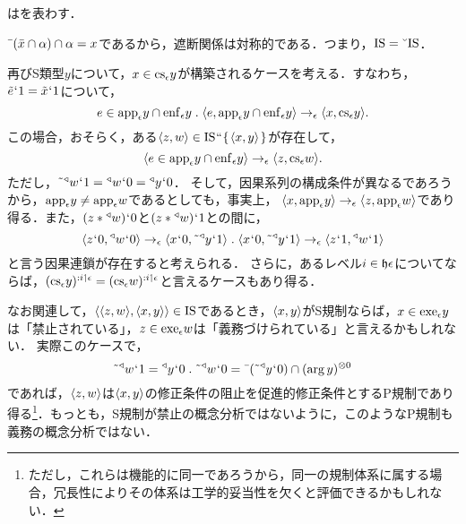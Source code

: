 \begin{df}
\label{df:遮断関係}
はを表わす．
\end{df}

\noindent $ \bar{\:\:}(\bar{x}\cap\alpha)\cap\alpha = x $であるから，遮断関係は対称的である．つまり，$ \mathrm{IS}=\breve{\:\:}\mathrm{IS} $．

再びS類型$y$について，$ x\in\mathrm{cs}_{\epsilon}y $が構築されるケースを考える．すなわち，$ \tilde{e}{\mspace{1mu}{`}\mspace{1mu}} 1 = \tilde{x}{\mspace{1mu}{`}\mspace{1mu}} 1 $について，
\[
    e\in\app{\epsilon} y\cap\enf{\epsilon}y\con{1}
    \orp{e,\app{\epsilon} y\cap\enf{\epsilon}y}\to_{\epsilon}\orp{x,\cs{\epsilon}y}.
\]
この場合，おそらく，ある$ \langle z,w \rangle\in\mathrm{IS}{\mspace{1mu}{``}\mspace{1mu}}\{\mspace{2mu}\langle x,y \rangle\mspace{2mu}\} $が存在して，
\[
    \langle e\in\mathrm{app}_{\epsilon} y\cap\mathrm{enf}_{\epsilon}y \rangle\to_{\epsilon}\langle z,\mathrm{cs}_{\epsilon}w \rangle.
\]
ただし，$ \tilde{\:\:}{^\triangleleft}w{\mspace{1mu}{`}\mspace{1mu}} 1 = {^\triangleleft}w{\mspace{1mu}{`}\mspace{1mu}} 0 = {^\triangleleft}y{\mspace{1mu}{`}\mspace{1mu}} 0 $．
そして，因果系列の構成条件が異なるであろうから，$ \mathrm{app}_{\epsilon} y \neq \mathrm{app}_{\epsilon} w $であるとしても，事実上，
$ \langle x,\mathrm{app}_{\epsilon} y \rangle\to_{\epsilon}\langle z,\mathrm{app}_{\epsilon} w \rangle $であり得る．また，$ (z*{^\triangleleft}w){\mspace{1mu}{`}\mspace{1mu}} 0 $と$ (z*{^\triangleleft}w){\mspace{1mu}{`}\mspace{1mu}} 1 $との間に，
\[
   \orp{z\fap 0,\trgl{w}\fap 0}\to_{\epsilon}\orp{x\fap 0,\tildel{\trgl{y}}\fap 1}\con{1}
    \orp{x\fap 0,\tildel{\trgl{y}}\fap 1}\to_{\epsilon}\orp{z\fap 1,\trgl{w}\fap 1}
\]
と言う因果連鎖が存在すると考えられる．
さらに，あるレベル$ i\in\mathfrak{h}\epsilon $についてならば，$ (\mathrm{cs}_{\epsilon}y)^{:i\mathbin{\upharpoonleft}\epsilon} = (\mathrm{cs}_{\epsilon}w)^{:i\mathbin{\upharpoonleft}\epsilon} $と言えるケースもあり得る．

なお関連して，$ \langle \langle z,w \rangle,\langle x,y \rangle \rangle\in\mathrm{IS} $であるとき，$ \langle x,y \rangle $がS規制ならば，$ x\in\mathrm{exe}_{\epsilon} y $は「禁止されている」，$ z\in\mathrm{exe}_{\epsilon} w $は「義務づけられている」と言えるかもしれない．
実際このケースで，
\[
    \tildel{\trgl{w}}\fap 1 = \trgl{y}\fap 0\con{1}
    \tildel{\trgl{w}}\fap 0 = \barl{(\tildel{\trgl{y}}\fap 0)}\cap\mser{(\arg y)}{0}
\]
であれば，$ \langle z,w \rangle $は$ \langle x,y \rangle $の修正条件の阻止を促進的修正条件とするP規制であり得る\footnote{
    ただし，これらは機能的に同一であろうから，同一の規制体系に属する場合，冗長性によりその体系は工学的妥当性を欠くと評価できるかもしれない．
}．もっとも，S規制が禁止の概念分析ではないように，このようなP規制も義務の概念分析ではない．

